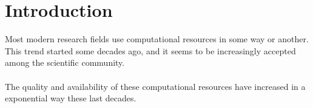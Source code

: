 \section{Introduction}
\label{sec:introduction}
Most modern research fields use computational resources in some way or another. This trend started some decades ago, and it seems to be increasingly accepted among the scientific community.\\
\\
The quality and availability of these computational resources have increased in a exponential way these last decades.

